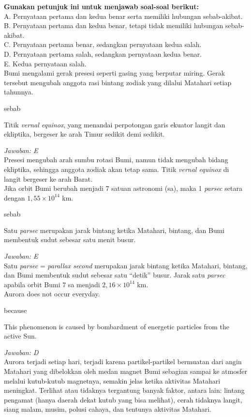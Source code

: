 \documentclass[11pt,fleqn]{exam}
\begin{document}
\begin{questions}
\textbf{Gunakan petunjuk ini untuk menjawab soal-soal berikut:}\\
A. Pernyataan pertama dan kedua benar serta memiliki hubungan sebab-akibat.\\
B. Pernyataan pertama dan kedua benar, tetapi tidak memiliki hubungan sebab-akibat.\\
C. Pernyataan pertama benar, sedangkan pernyataan kedua salah.\\
D. Pernyataan pertama salah, sedangkan pernyataan kedua benar.\\
E. Kedua pernyataan salah.\\


\question Bumi mengalami gerak presesi seperti gasing yang berputar miring. Gerak tersebut mengubah anggota rasi bintang zodiak yang dilalui Matahari setiap tahunnya.
\begin{center}
sebab
\end{center}
Titik \textit{vernal equinox}, yang menandai perpotongan garis ekuator langit dan ekliptika, bergeser ke arah Timur sedikit demi sedikit.

\textit{Jawaban: E}\\
Presesi mengubah arah sumbu rotasi Bumi, namun tidak mengubah bidang ekliptika, sehingga anggota zodiak akan tetap sama. Titik \textit{vernal equinox} di langit bergeser ke arah Barat.\\


\question Jika orbit Bumi berubah menjadi 7 satuan astronomi (sa), maka 1 \textit{parsec} setara dengan $1,55 \times 10^{14}$ km.
\begin{center}
sebab
\end{center}
Satu \textit{parsec} merupakan jarak bintang ketika Matahari, bintang, dan Bumi membentuk sudut sebesar satu menit busur.

\textit{Jawaban: E}\\
Satu \textit{parsec} = \textit{parallax second} merupakan jarak bintang ketika Matahari, bintang, dan Bumi membentuk sudut sebesar satu ``detik'' busur. Jarak satu \textit{parsec} apabila orbit Bumi 7 sa menjadi $2,16 \times 10^{14}$ km.\\


\question Aurora does not occur everyday.
\begin{center}
because
\end{center}
This phenomenon is caused by bombardment of energetic particles from the active Sun.

\textit{Jawaban: D}\\
Aurora terjadi setiap hari, terjadi karena partikel-partikel bermuatan dari angin Matahari yang dibelokkan oleh medan magnet Bumi sebagian sampai ke atmosfer melalui kutub-kutub magnetnya, semakin jelas ketika aktivitas Matahari meningkat. Terlihat atau tidaknya tergantung banyak faktor, antara lain: lintang pengamat (hanya daerah dekat kutub yang bisa melihat), cerah tidaknya langit, siang malam, musim, polusi cahaya, dan tentunya aktivitas Matahari.\\



\end{questions}
\end{document}
